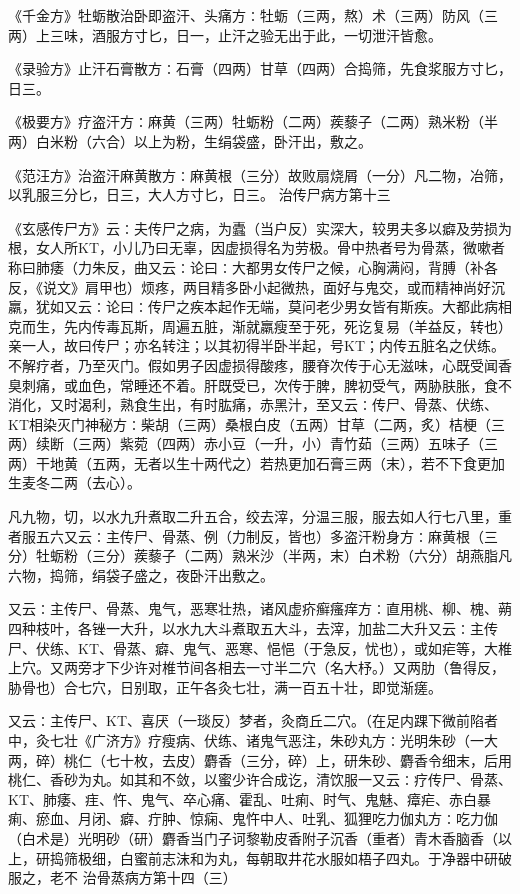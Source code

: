 \documentclass[a4paper,12pt,UTF8,twoside]{ctexbook}
\begin{document}
《千金方》牡蛎散治卧即盗汗、头痛方∶牡蛎（三两，熬）术（三两）防风（三两）上三味，酒服方寸匕，日一，止汗之验无出于此，一切泄汗皆愈。

《录验方》止汗石膏散方∶石膏（四两）甘草（四两）合捣筛，先食浆服方寸匕，日三。

《极要方》疗盗汗方∶麻黄（三两）牡蛎粉（二两）蒺藜子（二两）熟米粉（半两）白米粉（六合）以上为粉，生绢袋盛，卧汗出，敷之。

《范汪方》治盗汗麻黄散方∶麻黄根（三分）故败扇烧屑（一分）凡二物，冶筛，以乳服三分匕，日三，大人方寸匕，日三。
治传尸病方第十三

《玄感传尸方》云∶夫传尸之病，为蠹（当户反）实深大，较男夫多以癖及劳损为根，女人所KT，小儿乃曰无辜，因虚损得名为劳极。骨中热者号为骨蒸，微嗽者称曰肺痿（力朱反，曲又云∶论曰∶大都男女传尸之候，心胸满闷，背膊（补各反，《说文》肩甲也）烦疼，两目精多卧小起微热，面好与鬼交，或而精神尚好沉羸，犹如又云∶论曰∶传尸之疾本起作无端，莫问老少男女皆有斯疾。大都此病相克而生，先内传毒瓦斯，周遍五脏，渐就羸瘦至于死，死讫复易（羊益反，转也）亲一人，故曰传尸；亦名转注；以其初得半卧半起，号KT；内传五脏名之伏练。不解疗者，乃至灭门。假如男子因虚损得酸疼，腰脊次传于心无滋味，心既受闻香臭刺痛，或血色，常睡还不着。肝既受已，次传于脾，脾初受气，两胁肤胀，食不消化，又时渴利，熟食生出，有时肱痛，赤黑汁，至又云∶传尸、骨蒸、伏练、KT相染灭门神秘方∶柴胡（三两）桑根白皮（五两）甘草（二两，炙）桔梗（三两）续断（三两）紫菀（四两）赤小豆（一升，小）青竹茹（三两）五味子（三两）干地黄（五两，无者以生十两代之）若热更加石膏三两（末），若不下食更加生麦冬二两（去心）。

凡九物，切，以水九升煮取二升五合，绞去滓，分温三服，服去如人行七八里，重者服五六又云∶主传尸、骨蒸、例（力制反，皆也）多盗汗粉身方∶麻黄根（三分）牡蛎粉（三分）蒺藜子（二两）熟米沙（半两，末）白术粉（六分）胡燕脂凡六物，捣筛，绢袋子盛之，夜卧汗出敷之。

又云∶主传尸、骨蒸、鬼气，恶寒壮热，诸风虚疥癣瘙痒方∶直用桃、柳、槐、蒴四种枝叶，各锉一大升，以水九大斗煮取五大斗，去滓，加盐二大升又云∶主传尸、伏练、KT、骨蒸、癖、鬼气、恶寒、悒悒（于急反，忧也），或如疟等，大椎上穴。又两旁才下少许对椎节间各相去一寸半二穴（名大杼。）又两肋（鲁得反，胁骨也）合七穴，日别取，正午各灸七壮，满一百五十壮，即觉渐瘥。

又云∶主传尸、KT、喜厌（一琰反）梦者，灸商丘二穴。（在足内踝下微前陷者中，灸七壮《广济方》疗瘦病、伏练、诸鬼气恶注，朱砂丸方∶光明朱砂（一大两，碎）桃仁（七十枚，去皮）麝香（三分，碎）上，研朱砂、麝香令细末，后用桃仁、香砂为丸。如其和不敛，以蜜少许合成讫，清饮服一又云∶疗传尸、骨蒸、KT、肺痿、疰、忤、鬼气、卒心痛、霍乱、吐痢、时气、鬼魅、瘴疟、赤白暴痢、瘀血、月闭、癖、疔肿、惊痫、鬼忤中人、吐乳、狐狸吃力伽丸方∶吃力伽（白术是）光明砂（研）麝香当门子诃黎勒皮香附子沉香（重者）青木香脑香（以上，研捣筛极细，白蜜前志沫和为丸，每朝取井花水服如梧子四丸。于净器中研破服之，老不
治骨蒸病方第十四（三）
\end{document}
